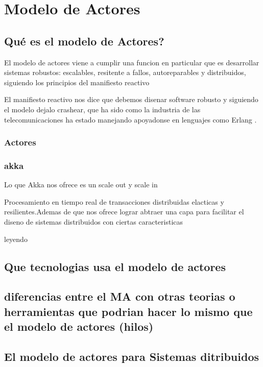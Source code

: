 
\chapter{Modelo de Actores} %
\label{Chapter2}

\section{\textquestiondown Qu\'e es el modelo de Actores?}
El modelo de actores viene a cumplir una funcion en particular que es
desarrollar sistemas robustos: escalables, resitente a fallos,
autoreparables y distribuidos, siguiendo los principios del manifiesto
 reactivo

El manifiesto reactivo nos dice que debemos disenar software robusto y
siguiendo el modelo dejalo crashear, que ha sido como la industria de
las telecomunicaciones ha estado manejando apoyadonse en lenguajes
como Erlang .

\subsection{Actores}

\subsection{akka}
Lo que Akka nos ofrece es un scale out y scale in

Procesamiento en tiempo real de transacciones distribuidas elacticas y
resilientes.Ademas de que nos ofrece lograr abtraer una capa para
facilitar el diseno de sistemas distribuidos con ciertas
caracteristicas

 leyendo

\section{Que tecnologias usa el modelo de actores}
\section{diferencias entre el MA con otras teorias o herramientas
  que podrian hacer lo mismo que el modelo de actores (hilos) }
\section{El modelo de actores para Sistemas ditribuidos }

